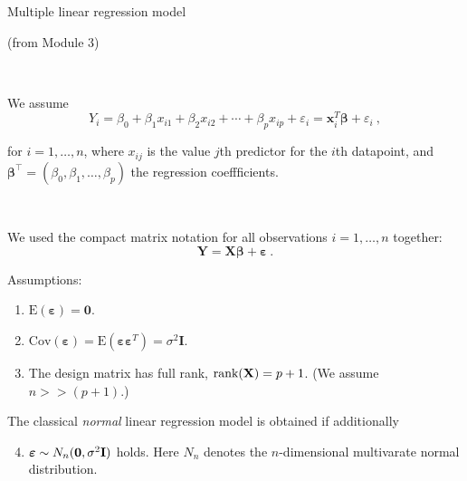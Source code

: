 \documentclass[10pt,ignorenonframetext,]{beamer}
\providecommand{\tightlist}{%
  \setlength{\itemsep}{0pt}\setlength{\parskip}{0pt}}
\begin{document}
\begin{frame}

\begin{block}{Multiple linear regression model}

(from Module 3)

\(~\)

We assume \[
 Y_i=\beta_0 + \beta_1 x_{i1}+\beta_2 x_{i2}+\cdots + \beta_p x_{ip}+\varepsilon_i={\boldsymbol x}_i^T{\boldsymbol\beta}+\varepsilon_i \ ,
\]

for \(i=1,\ldots,n\), where \(x_{ij}\) is the value \(j\)th predictor
for the \(i\)th datapoint, and
\({\boldsymbol\beta}^\top = (\beta_0,\beta_1,\ldots,\beta_p)\) the
regression coeffficients.

\(~\)

We used the compact matrix notation for all observations
\(i=1,\ldots,n\) together:
\[{\boldsymbol Y}={\boldsymbol {X}} \boldsymbol{\beta}+{\boldsymbol{\varepsilon}}  \ .\]

\end{block}

\end{frame}

\begin{frame}

Assumptions:

\begin{enumerate}
\tightlist
\item
  \(\text{E}(\boldsymbol{\varepsilon})=\boldsymbol{0}\).
\item
  \(\text{Cov}(\boldsymbol{\varepsilon})=\text{E}(\boldsymbol{\varepsilon}\boldsymbol{\varepsilon}^T)=\sigma^2\boldsymbol{I}\).
\item
  The design matrix has full rank, \(\text{rank}({\bf X})=p+1\). (We
  assume \(n>>(p+1)\).)
\end{enumerate}

The classical \emph{normal} linear regression model is obtained if
additionally

\begin{enumerate}
\setcounter{enumi}{3}
\tightlist
\item
  \(\boldsymbol\varepsilon\sim N_n({\boldsymbol 0},\sigma^2 {\bf I})\)
  holds. Here \(N_n\) denotes the \(n\)-dimensional multivarate normal
  distribution.
\end{enumerate}

\end{frame}
\end{document}
